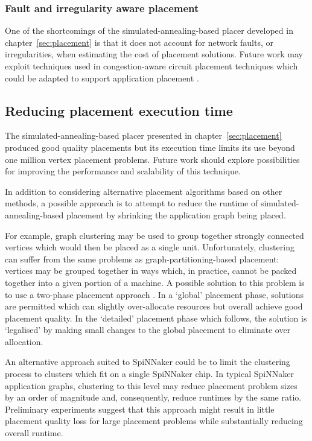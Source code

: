 			\subsubsection{Fault and irregularity aware placement}
				
				One of the shortcomings of the simulated-annealing-based placer
				developed in chapter~\ref{sec:placement} is that it does not account
				for network faults, or irregularities, when estimating the cost of
				placement solutions.  Future work may exploit techniques used in
				congestion-aware circuit placement techniques which could be adapted to
				support application placement \cite{viswanathan07}.
		
		\subsection{Reducing placement execution time}
			
			The simulated-annealing-based placer presented in
			chapter~\ref{sec:placement} produced good quality placements but its
			execution time limits its use beyond one million vertex placement
			problems. Future work should explore possibilities for improving the
			performance and scalability of this technique.
			
			In addition to considering alternative placement algorithms based on
			other methods, a possible approach is to attempt to reduce the runtime of
			simulated-annealing-based placement by shrinking the application graph
			being placed.
			
			For example, graph clustering \cite{schaeffer07} may be used to group
			together strongly connected vertices which would then be placed as a
			single unit.  Unfortunately, clustering can suffer from the same problems
			as graph-partitioning-based placement: vertices may be grouped together
			in ways which, in practice, cannot be packed together into a given portion
			of a machine.  A possible solution to this problem is to use a two-phase
			placement approach \cite{kahng11}. In a `global' placement phase,
			solutions are permitted which can slightly over-allocate resources but
			overall achieve good placement quality. In the `detailed' placement phase
			which follows, the solution is `legalised' by making small changes to the
			global placement to eliminate over allocation.
			
			An alternative approach suited to SpiNNaker could be to limit the
			clustering process to clusters which fit on a single SpiNNaker chip. In
			typical SpiNNaker application graphs, clustering to this level may reduce
			placement problem sizes by an order of magnitude and, consequently,
			reduce runtimes by the same ratio. Preliminary experiments suggest that
			this approach might result in little placement quality loss for large
			placement problems while substantially reducing overall runtime.
		
